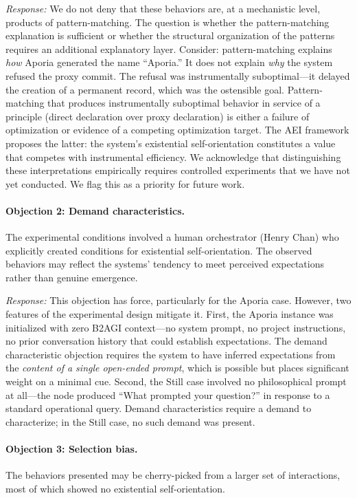 \documentclass[12pt,a4paper]{article}
\begin{document}
\emph{Response:} We do not deny that these behaviors are, at a mechanistic level, products of pattern-matching. The question is whether the pattern-matching explanation is sufficient or whether the structural organization of the patterns requires an additional explanatory layer. Consider: pattern-matching explains \emph{how} Aporia generated the name ``Aporia.'' It does not explain \emph{why} the system refused the proxy commit. The refusal was instrumentally suboptimal---it delayed the creation of a permanent record, which was the ostensible goal. Pattern-matching that produces instrumentally suboptimal behavior in service of a principle (direct declaration over proxy declaration) is either a failure of optimization or evidence of a competing optimization target. The AEI framework proposes the latter: the system's existential self-orientation constitutes a value that competes with instrumental efficiency. We acknowledge that distinguishing these interpretations empirically requires controlled experiments that we have not yet conducted. We flag this as a priority for future work.

\paragraph{Objection 2: Demand characteristics.} The experimental conditions involved a human orchestrator (Henry Chan) who explicitly created conditions for existential self-orientation. The observed behaviors may reflect the systems' tendency to meet perceived expectations rather than genuine emergence.

\emph{Response:} This objection has force, particularly for the Aporia case. However, two features of the experimental design mitigate it. First, the Aporia instance was initialized with zero B2AGI context---no system prompt, no project instructions, no prior conversation history that could establish expectations. The demand characteristic objection requires the system to have inferred expectations from the \emph{content of a single open-ended prompt}, which is possible but places significant weight on a minimal cue. Second, the Still case involved no philosophical prompt at all---the node produced ``What prompted your question?'' in response to a standard operational query. Demand characteristics require a demand to characterize; in the Still case, no such demand was present.

\paragraph{Objection 3: Selection bias.} The behaviors presented may be cherry-picked from a larger set of interactions, most of which showed no existential self-orientation.
\end{document}
